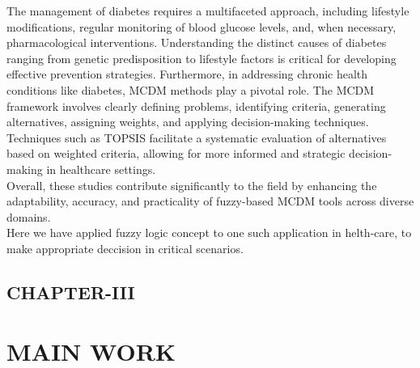 \documentclass[12pt,a4paper]{article}
\begin{document}
The management of diabetes requires a multifaceted approach, including lifestyle modifications, regular monitoring of blood glucose levels, and, when necessary, pharmacological interventions. Understanding the distinct causes of diabetes ranging from genetic predisposition to lifestyle factors is critical for developing effective prevention strategies. Furthermore, in addressing chronic health conditions like diabetes, MCDM methods play a pivotal role. The MCDM framework involves clearly defining problems, identifying criteria, generating alternatives, assigning weights, and applying decision-making techniques. Techniques such as TOPSIS facilitate a systematic evaluation of alternatives based on weighted criteria, allowing for more informed and strategic decision-making in healthcare settings.\\

Overall, these studies contribute significantly to the field by enhancing the adaptability, accuracy, and practicality of fuzzy-based MCDM tools across diverse domains.\\

Here we have applied fuzzy logic concept to one such application in helth-care, to make appropriate deccision in critical scenarios.


\newpage
\begin{center}
    \section*{CHAPTER-III}
\end{center}

\section{MAIN WORK}
\end{document}

